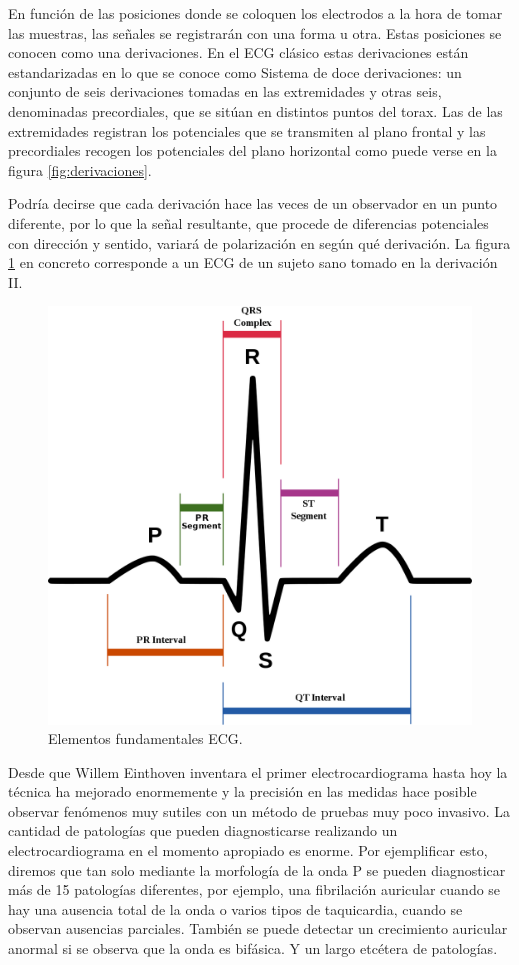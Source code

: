 En función de las posiciones donde se coloquen los electrodos a la hora de tomar las muestras, las señales se registrarán con una forma u otra. Estas posiciones se conocen como una derivaciones. En el ECG clásico estas derivaciones están estandarizadas en lo que se conoce como Sistema de doce derivaciones: un conjunto de seis derivaciones tomadas en las extremidades y otras seis, denominadas precordiales, que se sitúan en distintos puntos del torax. Las de las extremidades registran los potenciales que se transmiten al plano frontal y las precordiales recogen los potenciales del plano horizontal como puede verse en la figura \ref{fig:derivaciones}. \cite{Harrison}

Podría decirse que cada derivación hace las veces de un observador en un punto diferente, por lo que la señal resultante, que procede de diferencias potenciales con dirección y sentido, variará de polarización en según qué derivación. La figura \ref{fig:ECGelements} en concreto corresponde a un ECG de un sujeto sano tomado en la derivación II.

\begin{figure}[ht]  
    \centering
        \includegraphics[width =0.4\linewidth]{figuras/ECGelementsDetailed.png}
    \caption{Elementos fundamentales ECG.}
    \label{fig:ECGelements}
\end{figure}

Desde que Willem Einthoven inventara el primer electrocardiograma hasta hoy la técnica ha mejorado enormemente y la precisión en las medidas hace posible observar fenómenos muy sutiles con un método de pruebas muy poco invasivo. La cantidad de patologías que pueden diagnosticarse realizando un electrocardiograma en el momento apropiado es enorme. \cite{PatologiasECG} Por ejemplificar esto, diremos que tan solo mediante la morfología de la onda P se pueden diagnosticar más de 15 patologías diferentes, por ejemplo, una fibrilación auricular cuando se hay una ausencia total de la onda o varios tipos de taquicardia, cuando se observan ausencias parciales. También se puede detectar un crecimiento auricular anormal si se observa que la onda es bifásica. Y un largo etcétera de patologías.

